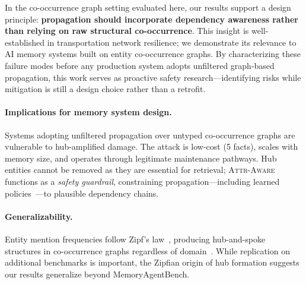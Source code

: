 \documentclass{article}
\newcommand{\attraware}{\textsc{Attr-Aware}}
\begin{document}
In the co-occurrence graph setting evaluated here, our results support a design principle: \textbf{propagation should incorporate dependency awareness rather than relying on raw structural co-occurrence}.
This insight is well-established in transportation network resilience; we demonstrate its relevance to AI memory systems built on entity co-occurrence graphs.
By characterizing these failure modes before any production system adopts unfiltered graph-based propagation, this work serves as proactive safety research---identifying risks while mitigation is still a design choice rather than a retrofit.

\paragraph{Implications for memory system design.}
Systems adopting unfiltered propagation over untyped co-occurrence graphs are vulnerable to hub-amplified damage.
The attack is low-cost (5 facts), scales with memory size, and operates through legitimate maintenance pathways.
Hub entities cannot be removed as they are essential for retrieval; \attraware{} functions as a \textit{safety guardrail}, constraining propagation---including learned policies~\citep{mars_2025}---to plausible dependency chains.

\paragraph{Generalizability.}
Entity mention frequencies follow Zipf's law~\citep{zipf_1949}, producing hub-and-spoke structures in co-occurrence graphs regardless of domain~\citep{steyvers_semantic_2005, barabasi_scalefree_1999}.
While replication on additional benchmarks is important, the Zipfian origin of hub formation suggests our results generalize beyond MemoryAgentBench.
\end{document}

